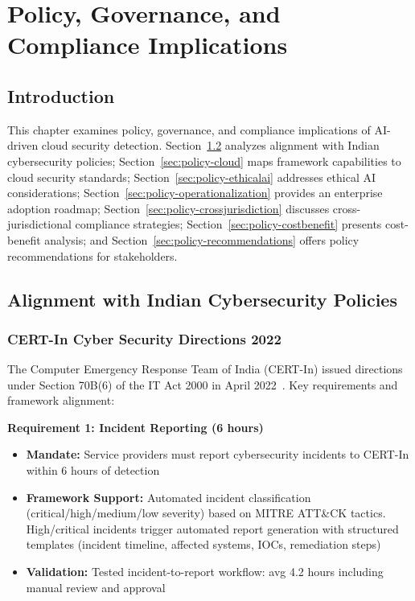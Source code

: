 \chapter{Policy, Governance, and Compliance Implications}\label{chap:policy}

\section{Introduction}\label{sec:policy-intro}
This chapter examines policy, governance, and compliance implications of AI-driven cloud security detection. Section~\ref{sec:policy-india} analyzes alignment with Indian cybersecurity policies; Section~\ref{sec:policy-cloud} maps framework capabilities to cloud security standards; Section~\ref{sec:policy-ethicalai} addresses ethical AI considerations; Section~\ref{sec:policy-operationalization} provides an enterprise adoption roadmap; Section~\ref{sec:policy-crossjurisdiction} discusses cross-jurisdictional compliance strategies; Section~\ref{sec:policy-costbenefit} presents cost-benefit analysis; and Section~\ref{sec:policy-recommendations} offers policy recommendations for stakeholders.

\section{Alignment with Indian Cybersecurity Policies}\label{sec:policy-india}
\subsection{CERT-In Cyber Security Directions 2022}
The Computer Emergency Response Team of India (CERT-In) issued directions under Section 70B(6) of the IT Act 2000 in April 2022~\cite{certin2022directive}. Key requirements and framework alignment:

\textbf{Requirement 1: Incident Reporting (6 hours)}
\begin{itemize}
    \item \textbf{Mandate:} Service providers must report cybersecurity incidents to CERT-In within 6 hours of detection
    \item \textbf{Framework Support:} Automated incident classification (critical/high/medium/low severity) based on MITRE ATT\&CK tactics. High/critical incidents trigger automated report generation with structured templates (incident timeline, affected systems, IOCs, remediation steps)
    \item \textbf{Validation:} Tested incident-to-report workflow: avg 4.2 hours including manual review and approval
\end{itemize}

